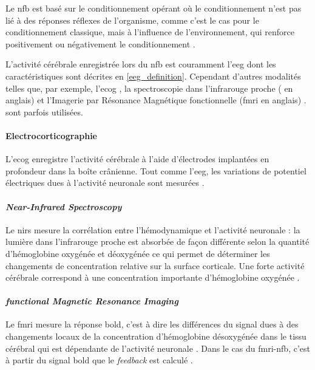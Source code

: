 Le \gls{nfb} est basé sur le conditionnement opérant \citep{Reynolds1975} où le conditionnement n'est pas lié à 
des réponses réflexes de l'organisme, comme c'est le cas pour le conditionnement classique, mais à l'influence de l'environnement, qui 
renforce positivement ou négativement le conditionnement \citep{Skinner1948}. 

L'activité cérébrale enregistrée lors du \gls{nfb} est couramment l'\gls{eeg} dont les caractéristiques sont décrites en \ref{eeg_definition}.
Cependant d'autres modalités telles que, par exemple, 
l'\gls{ecog} \citep{Khanna2016, Gharabaghi2014}, la spectroscopie dans l'infrarouge proche ( en anglais) \citep{Marx2015} et 
l'Imagerie par Résonance Magnétique fonctionnelle (\gls{fmri} en anglais) \citep{Sulzer2013}.
sont parfois utilisées. 

\paragraph{Electrocorticographie} 
L'\gls{ecog} enregistre l'activité cérébrale à l'aide d'électrodes implantées en profondeur dans la boîte crânienne. Tout comme l'\gls{eeg}, 
les variations de potentiel électriques dues à l'activité neuronale sont mesurées \citep{Leuthardt2006}. 

\paragraph{\textit{Near-Infrared Spectroscopy}} 
Le \gls{nirs} mesure la corrélation entre l'hémodynamique et l'activité neuronale : la lumière dans l'infrarouge proche est absorbée de
façon différente selon la quantité d'hémoglobine oxygénée et déoxygénée ce qui permet de déterminer les changements de concentration relative
sur la surface corticale. Une forte activité cérébrale correspond à une concentration importante d'hémoglobine oxygénée \citep{Fallgatter1997, Marx2015}. 

\paragraph{\textit{functional Magnetic Resonance Imaging}} 
Le \gls{fmri} mesure la réponse \gls{bold}, c'est à dire les différences du signal dues à des changements locaux de la concentration d'hémoglobine désoxygénée 
dans le tissu cérébral qui est dépendante de l'activité neuronale \citep{Dewiputri2013}. Dans le cas du \gls{fmri}-\gls{nfb}, c'est à partir du signal 
\gls{bold} que le \textit{feedback} est calculé \citep{Dewiputri2013}. 

